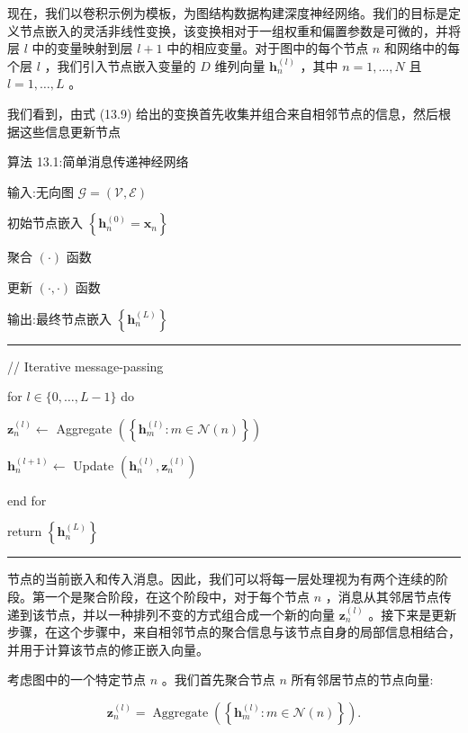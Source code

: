 \documentclass[10pt]{article}
\newcommand{\HRule}{\begin{center}\rule{0.9\linewidth}{0.2mm}\end{center}}
\begin{document}
现在，我们以卷积示例为模板，为图结构数据构建深度神经网络。我们的目标是定义节点嵌入的灵活非线性变换，该变换相对于一组权重和偏置参数是可微的，并将层 \(l\) 中的变量映射到层 \(l + 1\) 中的相应变量。对于图中的每个节点 \(n\) 和网络中的每个层 \(l\) ，我们引入节点嵌入变量的 \(D\) 维列向量 \({\mathbf{h}}_{n}^{\left( l\right) }\) ，其中 \(n = 1,\ldots ,N\) 且 \(l = 1,\ldots ,L\) 。

我们看到，由式 (13.9) 给出的变换首先收集并组合来自相邻节点的信息，然后根据这些信息更新节点

算法 13.1:简单消息传递神经网络

输入:无向图 \(\mathcal{G} = \left( {\mathcal{V},\mathcal{E}}\right)\)

初始节点嵌入 \(\left\{  {{\mathbf{h}}_{n}^{\left( 0\right) } = {\mathbf{x}}_{n}}\right\}\)

聚合 \(\left( \cdot \right)\) 函数

更新 \(\left( {\cdot , \cdot  }\right)\) 函数

输出:最终节点嵌入 \(\left\{  {\mathbf{h}}_{n}^{\left( L\right) }\right\}\)

\HRule

// Iterative message-passing

for \(l \in  \{ 0,\ldots ,L - 1\}\) do

\hspace*{1em} \({\mathbf{z}}_{n}^{\left( l\right) } \leftarrow\) Aggregate \(\left( \left\{  {{\mathbf{h}}_{m}^{\left( l\right) } : m \in  \mathcal{N}\left( n\right) }\right\}  \right)\)

\hspace*{1em} \({\mathbf{h}}_{n}^{\left( l + 1\right) } \leftarrow\) Update \(\left( {{\mathbf{h}}_{n}^{\left( l\right) },{\mathbf{z}}_{n}^{\left( l\right) }}\right)\)

end for

return \(\left\{  {\mathbf{h}}_{n}^{\left( L\right) }\right\}\)

\HRule

节点的当前嵌入和传入消息。因此，我们可以将每一层处理视为有两个连续的阶段。第一个是聚合阶段，在这个阶段中，对于每个节点 \(n\) ，消息从其邻居节点传递到该节点，并以一种排列不变的方式组合成一个新的向量 \({\mathbf{z}}_{n}^{\left( l\right) }\) 。接下来是更新步骤，在这个步骤中，来自相邻节点的聚合信息与该节点自身的局部信息相结合，并用于计算该节点的修正嵌入向量。

考虑图中的一个特定节点 \(n\) 。我们首先聚合节点 \(n\) 所有邻居节点的节点向量:

\[
{\mathbf{z}}_{n}^{\left( l\right) } = \operatorname{Aggregate}\left( \left\{  {{\mathbf{h}}_{m}^{\left( l\right) } : m \in  \mathcal{N}\left( n\right) }\right\}  \right) . \tag{13.10}
\]
\end{document}
